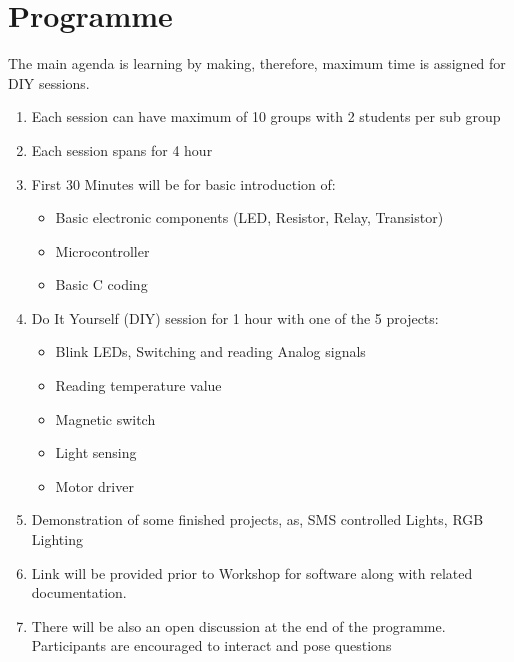 \documentclass[12pt]{article} %
\begin{document}
\section{Programme} %
The main agenda is learning by making, therefore, maximum time is assigned for DIY sessions.
\begin{enumerate}
\item Each session can have maximum of 10 groups with 2 students per sub group
\item Each session spans for 4 hour
\item First 30 Minutes will be for basic introduction of:  
	\begin{itemize}
		\item Basic electronic components (LED, Resistor, Relay, Transistor)
		\item Microcontroller
		\item Basic C coding
	\end{itemize}
\item Do It Yourself (DIY) session for 1 hour with one of the 5 projects:
	\begin{itemize}
	\item Blink LEDs, Switching and reading Analog signals
	\item Reading temperature value
	\item Magnetic switch
	\item Light sensing
	\item Motor driver
	\end{itemize}
\item Demonstration of some finished projects, as, SMS controlled Lights, RGB Lighting
\item Link will be provided prior to Workshop for software along with related documentation.
\item There will be also an open discussion at the end of the programme. Participants are encouraged to interact and pose questions
\end{enumerate}
\end{document}
